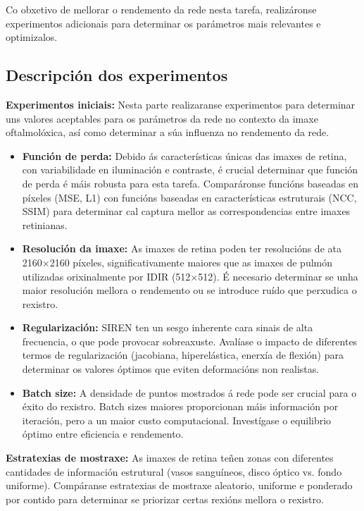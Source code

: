 Co obxetivo de mellorar o rendemento da rede nesta tarefa, realizáronse experimentos adicionais para determinar os parámetros mais relevantes e optimizalos.

\subsection{Descripción dos experimentos}
\label{subsec:Descripción dos experimentos}


\textbf{Experimentos iniciais:} Nesta parte realizaranse experimentos para determinar uns valores aceptables para os parámetros da rede no contexto da imaxe oftalmolóxica, 
así como determinar a súa influenza no rendemento da rede.

\begin{itemize}
    \item \textbf{Función de perda:} Debido ás características únicas das imaxes de retina, con variabilidade en iluminación e contraste, é crucial determinar que función de perda é máis robusta para esta tarefa. Comparáronse funcións baseadas en píxeles (MSE, L1) con funcións baseadas en características estruturais (NCC, SSIM) para determinar cal captura mellor as correspondencias entre imaxes retinianas.
    \item \textbf{Resolución da imaxe:} As imaxes de retina poden ter resolucións de ata 2160×2160 píxeles, significativamente maiores que as imaxes de pulmón utilizadas orixinalmente por IDIR (512×512). É necesario determinar se unha maior resolución mellora o rendemento ou se introduce ruído que perxudica o rexistro.
    \item \textbf{Regularización:} SIREN ten un sesgo inherente cara sinais de alta frecuencia, o que pode provocar sobreaxuste. Avalíase o impacto de diferentes termos de regularización (jacobiana, hiperelástica, enerxía de flexión) para determinar os valores óptimos que eviten deformacións non realistas.
    \item \textbf{Batch size:} A densidade de puntos mostrados á rede pode ser crucial para o éxito do rexistro. Batch sizes maiores proporcionan máis información por iteración, pero a un maior custo computacional. Investígase o equilibrio óptimo entre eficiencia e rendemento.
\end{itemize}

\textbf{Estratexias de mostraxe:} As imaxes de retina teñen zonas con diferentes cantidades de información estrutural (vasos sanguíneos, disco óptico vs. fondo uniforme). Compáranse estratexias de mostraxe aleatorio, uniforme e ponderado por contido para determinar se priorizar certas rexións mellora o rexistro.

